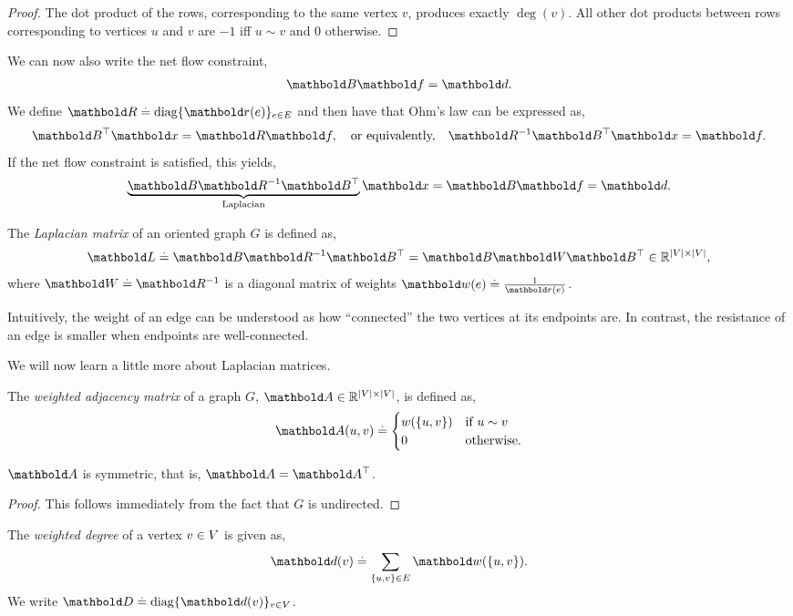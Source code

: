 \begin{proof} The dot product of the rows, corresponding to the same vertex $v$, produces exactly $\deg(v)$. All other dot products between rows corresponding to vertices $u$ and $v$ are $-1$ iff $u \sim v$ and $0$ otherwise.
\end{proof}
We can now also write the net flow constraint, \begin{align}
    \mB\vf = \vd.
\end{align} We define $\mR \defeq \diag\{\vr(e)\}_{e \in \sE}$ and then have that Ohm's law can be expressed as, \begin{align}
    \trans{\mB}\vx = \mR\vf, \quad\text{or equivalently,}\quad \mR^{-1}\trans{\mB}\vx = \vf.
\end{align} If the net flow constraint is satisfied, this yields, \begin{align}
    \underbrace{\mB\mR^{-1}\trans{\mB}}_{\text{Laplacian}}\vx = \mB\vf = \vd. \label{eq:ohms_law_and_net_flow_constraint}
\end{align}
\begin{defn}
The \emph{Laplacian matrix} of an oriented graph $G$ is defined as, \begin{align}
    \mL \defeq \mB\mR^{-1}\trans{\mB} = \mB\mW\trans{\mB} \in \R^{|\sV|\times|\sV|},
\end{align} where $\mW \defeq \mR^{-1}$ is a diagonal matrix of weights $\vw(e) \defeq \frac{1}{\vr(e)}$.
\end{defn}\noindent Intuitively, the weight of an edge can be understood as how ``connected'' the two vertices at its endpoints are. In contrast, the resistance of an edge is smaller when endpoints are well-connected.

We will now learn a little more about Laplacian matrices.
\begin{defn}
The \emph{weighted adjacency matrix} of a graph $G$, $\mA \in \R^{|\sV|\times|\sV|}$, is defined as, \begin{align}
    \mA(u, v) \defeq \begin{cases}
        w(\{u,v\}) & \text{if $u \sim v$} \\
        0 & \text{otherwise}.
    \end{cases}
\end{align}
\end{defn}
\begin{lem}
$\mA$ is symmetric, that is, $\mA = \trans{\mA}$.
\end{lem}
\begin{proof}
This follows immediately from the fact that $G$ is undirected.
\end{proof}
\begin{defn}
The \emph{weighted degree} of a vertex $v \in V$ is given as, \begin{align}
    \vd(v) \defeq \sum_{\{u,v\} \in \sE} \vw(\{u,v\}).
\end{align} We write $\mD \defeq \diag\{\vd(v)\}_{v \in \sV}$.
\end{defn}

